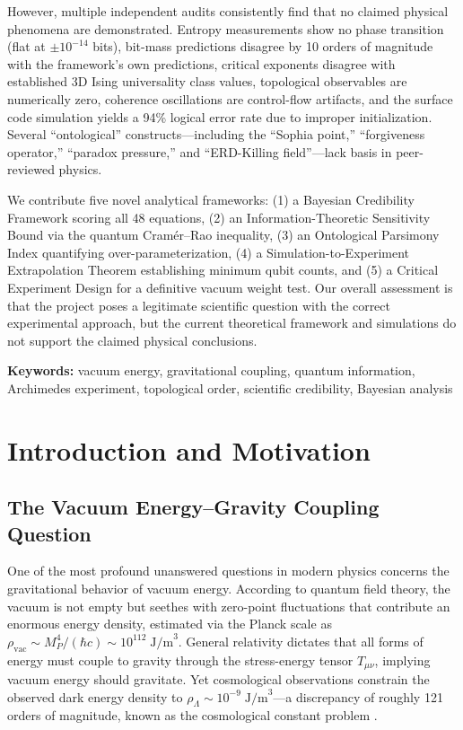 \documentclass[11pt,a4paper]{article}
\begin{document}
However, multiple independent audits consistently find that no claimed physical phenomena are demonstrated. Entropy measurements show no phase transition (flat at $\pm 10^{-14}$ bits), bit-mass predictions disagree by 10 orders of magnitude with the framework's own predictions, critical exponents disagree with established 3D Ising universality class values, topological observables are numerically zero, coherence oscillations are control-flow artifacts, and the surface code simulation yields a 94\% logical error rate due to improper initialization. Several ``ontological'' constructs---including the ``Sophia point,'' ``forgiveness operator,'' ``paradox pressure,'' and ``ERD-Killing field''---lack basis in peer-reviewed physics.

We contribute five novel analytical frameworks: (1) a Bayesian Credibility Framework scoring all 48 equations, (2) an Information-Theoretic Sensitivity Bound via the quantum Cram\'er--Rao inequality, (3) an Ontological Parsimony Index quantifying over-parameterization, (4) a Simulation-to-Experiment Extrapolation Theorem establishing minimum qubit counts, and (5) a Critical Experiment Design for a definitive vacuum weight test. Our overall assessment is that the project poses a legitimate scientific question with the correct experimental approach, but the current theoretical framework and simulations do not support the claimed physical conclusions.

\vspace{0.3cm}
\textbf{Keywords:} vacuum energy, gravitational coupling, quantum information, Archimedes experiment, topological order, scientific credibility, Bayesian analysis

\section{Introduction and Motivation}

\subsection{The Vacuum Energy--Gravity Coupling Question}

One of the most profound unanswered questions in modern physics concerns the gravitational behavior of vacuum energy. According to quantum field theory, the vacuum is not empty but seethes with zero-point fluctuations that contribute an enormous energy density, estimated via the Planck scale as $\rho_{\text{vac}} \sim M_P^4 / (\hbar c) \sim 10^{112}\;\text{J/m}^3$. General relativity dictates that all forms of energy must couple to gravity through the stress-energy tensor $T_{\mu\nu}$, implying vacuum energy should gravitate. Yet cosmological observations constrain the observed dark energy density to $\rho_\Lambda \sim 10^{-9}\;\text{J/m}^3$---a discrepancy of roughly 121 orders of magnitude, known as the cosmological constant problem \cite{Weinberg1989}.
\end{document}
